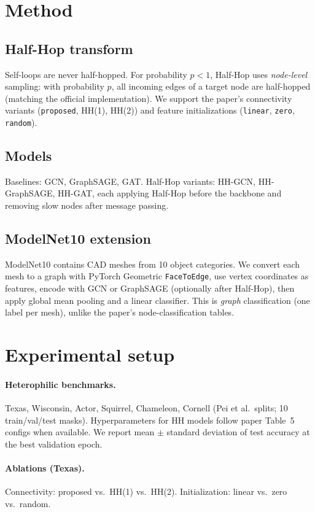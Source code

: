 \documentclass[11pt,a4paper]{article}
\begin{document}
\section{Method}
\subsection{Half-Hop transform}
Self-loops are never half-hopped.
For probability $p<1$, Half-Hop uses \emph{node-level} sampling: with
probability $p$, all incoming edges of a target node are half-hopped
(matching the official implementation).
We support the paper's connectivity variants (\texttt{proposed}, HH(1), HH(2))
and feature initializations (\texttt{linear}, \texttt{zero}, \texttt{random}).

\subsection{Models}
Baselines: GCN, GraphSAGE, GAT.
Half-Hop variants: HH-GCN, HH-GraphSAGE, HH-GAT, each applying Half-Hop before
the backbone and removing slow nodes after message passing.

\subsection{ModelNet10 extension}
ModelNet10 contains CAD meshes from 10 object categories.
We convert each mesh to a graph with PyTorch Geometric
\texttt{FaceToEdge}, use vertex coordinates as features, encode with
GCN or GraphSAGE (optionally after Half-Hop), then apply global mean pooling
and a linear classifier.
This is \emph{graph} classification (one label per mesh), unlike the paper's
node-classification tables.

\section{Experimental setup}
\paragraph{Heterophilic benchmarks.}
Texas, Wisconsin, Actor, Squirrel, Chameleon, Cornell
(Pei et al.\ splits; 10 train/val/test masks).
Hyperparameters for HH models follow paper Table~5 configs when available.
We report mean $\pm$ standard deviation of test accuracy at the best
validation epoch.

\paragraph{Ablations (Texas).}
Connectivity: proposed vs.\ HH(1) vs.\ HH(2).
Initialization: linear vs.\ zero vs.\ random.
\end{document}
